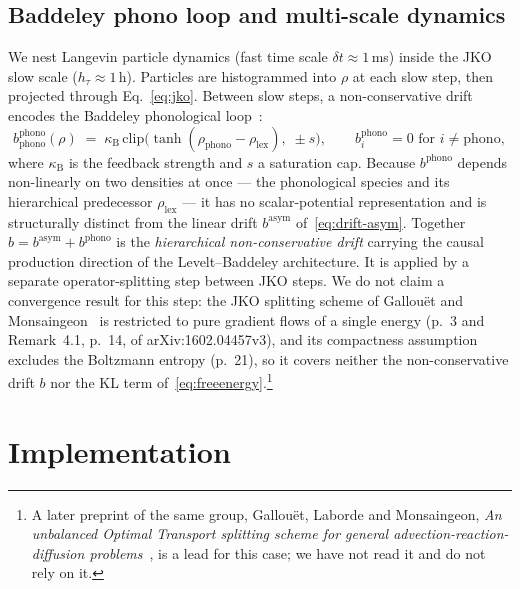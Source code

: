 \documentclass[11pt]{article}
\begin{document}
\subsection{Baddeley phono loop and multi-scale dynamics}
\label{sec:phonoloop}
We nest Langevin particle dynamics (fast time scale $\delta t \approx 1\,$ms)
inside the JKO slow scale ($h_\tau \approx 1\,$h). Particles are
histogrammed into $\rho$ at each slow step, then projected through
Eq.~\ref{eq:jko}. Between slow steps, a non-conservative drift encodes
the Baddeley phonological loop~\cite{baddeley1992working}:
\begin{equation}
  b^{\mathrm{phono}}_{\mathrm{phono}}(\rho)
    \;=\; \kappa_{\mathrm{B}}\,\mathrm{clip}\!\big(\tanh(\rho_{\mathrm{phono}} - \rho_{\mathrm{lex}}),\; \pm s\big),
  \qquad b^{\mathrm{phono}}_i = 0 \text{ for } i \neq \mathrm{phono},
  \label{eq:phono-drift}
\end{equation}
where $\kappa_{\mathrm{B}}$ is the feedback strength and $s$ a
saturation cap. Because $b^{\mathrm{phono}}$ depends non-linearly on
two densities at once --- the phonological species and its hierarchical
predecessor $\rho_{\mathrm{lex}}$ --- it has no scalar-potential
representation and is structurally distinct from the linear drift
$b^{\mathrm{asym}}$ of~\eqref{eq:drift-asym}. Together
$b = b^{\mathrm{asym}} + b^{\mathrm{phono}}$ is the
\emph{hierarchical non-conservative drift} carrying the causal
production direction of the Levelt--Baddeley architecture. It is
applied by a separate operator-splitting step between JKO steps. We do
not claim a convergence result for this step: the JKO splitting scheme
of Gallou\"et and Monsaingeon~\cite{gallouet2017splitting} is restricted
to pure gradient flows of a single energy (p.~3 and Remark~4.1, p.~14,
of arXiv:1602.04457v3), and its compactness assumption excludes the
Boltzmann entropy (p.~21), so it covers neither the non-conservative
drift $b$ nor the KL term of~\eqref{eq:freeenergy}.\footnote{A
later preprint of the same group, Gallou\"et, Laborde and Monsaingeon,
\emph{An unbalanced Optimal Transport splitting scheme for general
advection-reaction-diffusion problems}~\cite{gallouet2017unbalanced},
is a lead for this case; we have not read it and do not rely on it.}

\section{Implementation}
\label{sec:impl}
\end{document}
